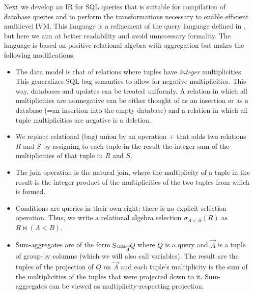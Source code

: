 \def\Sum{\mbox{Sum}}


Next we develop an IR for SQL queries that is suitable for compilation of database queries and to perform the transformations necessary to enable efficient multilevel IVM. This language is a refinement of the query language defined in \cite{koch-pods:10}, but here we aim at better readability and avoid unnecessary formality. The language is based on positive relational algebra with aggregation but makes the following modifications:
%
\begin{itemize}
\addtolength{\topsep}{-0.3ex}
\addtolength{\labelsep}{-0.3ex}
\addtolength{\itemsep}{-1ex}
\item
The data model is that of relations where tuples have {\em integer} multiplicities. This generalizes SQL bag semantics to allow for
negative multiplicities. This way, databases and updates can be treated uniformly. A relation in which all multiplicities are
nonnegative can be either thought of as an insertion or as a database (=an insertion into the empty database) and a relation in which all tuple multiplicities are negative is a deletion.

\item
We replace relational (bag) union by an operation $+$ that adds two relations $R$ and $S$ by assigning to each tuple in the result the integer sum of the multiplicities of that tuple in $R$ and $S$.
%

\item
The join operation is the natural join, where the multiplicity of a tuple in the result
is the integer product of the multiplicities of the two tuples from which is formed.

\item
Conditions are queries in their own right; there is no explicit selection operation. Thus, we write a relational algebra selection
$\sigma_{A<B}(R)$ as $R \bowtie (A<B)$.

\item
Sum-aggregates are of the form $\Sum_{\vec{A}} Q$ where $Q$ is a query and $\vec{A}$ is a tuple of group-by columns (which we will also
call variables). The result are the tuples of the projection of $Q$ on $\vec{A}$ and each tuple's multiplicity is the sum of the
multiplicities of the tuples that were projected down to it.
Sum-aggregates can be viewed as multiplicity-respecting projection.


\end{itemize}
